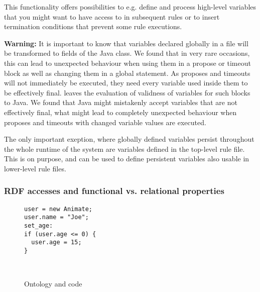 This functionality offers possibilities to e.g. define and process high-level
variables that you might want to have access to in subsequent rules or to insert
termination conditions that prevent some rule executions.

\textbf{Warning:} It is important to know that variables declared globally
in a file will be transformed to fields of the Java class. We found that in
very rare occasions, this can lead to unexpected behaviour when using them in a
propose or timeout block as well as changing them in a global statement. As
proposes and timeouts will not immediately be executed, they need every
variable used inside them to be effectively final. \vonda leaves the evaluation
of validness of variables for such blocks to Java. We found that Java might
mistakenly accept variables that are not effectively final, what might lead to
completely unexpected behaviour when proposes and timeouts with changed
variable values are executed.

The only important exeption, where globally defined variables persist throughout
the whole runtime of the system are variables defined in the top-level rule
file. This is on purpose, and can be used to define persistent
variables also usable in lower-level rule files.

\subsubsection{RDF accesses and functional vs. relational properties}
\label{sec:rdfaccesses}

\begin{figure}[htb]
\begin{minipage}{0.5\columnwidth}
\small%
\begin{lstlisting}
user = new Animate;
user.name = "Joe";
set_age:
if (user.age <= 0) {
  user.age = 15;
}
\end{lstlisting}
\end{minipage}\ \vrule\hspace{1ex}
\begin{minipage}{0.44\columnwidth}
    \small{}
\end{minipage}
  \caption{Ontology and \vonda code}
  \label{fig:rdfobjects}
\end{figure}

